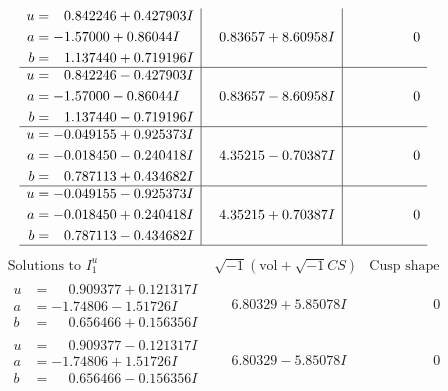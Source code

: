 \documentclass[1p]{elsarticle_modified}
\theoremstyle{definition}
\newcommand{\I}{\sqrt{-1}}
\begin{document}
$$\begin{array}{c|c|c}
\begin{aligned}
u &= \phantom{-}0.842246 + 0.427903 I \\
a &= -1.57000 + 0.86044 I \\
b &= \phantom{-}1.137440 + 0.719196 I\end{aligned}
 & \phantom{-}0.83657 + 8.60958 I & \phantom{-0.000000 } 0 \\ \hline\begin{aligned}
u &= \phantom{-}0.842246 - 0.427903 I \\
a &= -1.57000 - 0.86044 I \\
b &= \phantom{-}1.137440 - 0.719196 I\end{aligned}
 & \phantom{-}0.83657 - 8.60958 I & \phantom{-0.000000 } 0 \\ \hline\begin{aligned}
u &= -0.049155 + 0.925373 I \\
a &= -0.018450 - 0.240418 I \\
b &= \phantom{-}0.787113 + 0.434682 I\end{aligned}
 & \phantom{-}4.35215 - 0.70387 I & \phantom{-0.000000 } 0 \\ \hline\begin{aligned}
u &= -0.049155 - 0.925373 I \\
a &= -0.018450 + 0.240418 I \\
b &= \phantom{-}0.787113 - 0.434682 I\end{aligned}
 & \phantom{-}4.35215 + 0.70387 I & \phantom{-0.000000 } 0\\
 \hline 
 \end{array}$$\newpage$$\begin{array}{c|c|c}  
\text{Solutions to }I^u_{1}& \I (\text{vol} + \sqrt{-1}CS) & \text{Cusp shape}\\
 \hline 
\begin{aligned}
u &= \phantom{-}0.909377 + 0.121317 I \\
a &= -1.74806 - 1.51726 I \\
b &= \phantom{-}0.656466 + 0.156356 I\end{aligned}
 & \phantom{-}6.80329 + 5.85078 I & \phantom{-0.000000 } 0 \\ \hline\begin{aligned}
u &= \phantom{-}0.909377 - 0.121317 I \\
a &= -1.74806 + 1.51726 I \\
b &= \phantom{-}0.656466 - 0.156356 I\end{aligned}
 & \phantom{-}6.80329 - 5.85078 I & \phantom{-0.000000 } 0 \\ \hline\begin{aligned}

\end{aligned}
\end{array}$$
\end{document}
